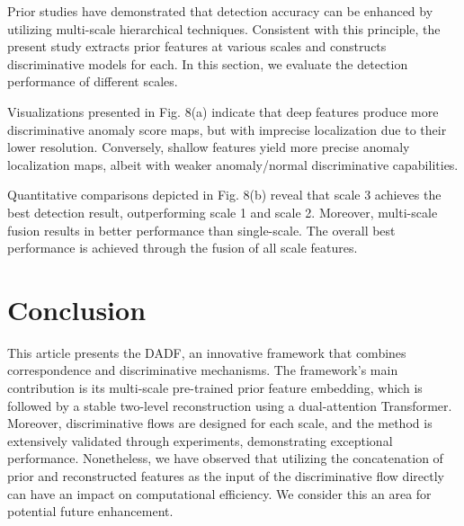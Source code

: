 \documentclass[journal]{IEEEtran}
\begin{document}
Prior studies\cite{r11} have demonstrated that detection accuracy can be enhanced by utilizing multi-scale hierarchical techniques. Consistent with this principle, the present study extracts prior features at various scales and constructs discriminative models for each. In this section, we evaluate the detection performance of different scales.

Visualizations presented in Fig. 8(a) indicate that deep features produce more discriminative anomaly score maps, but with imprecise localization due to their lower resolution. Conversely, shallow features yield more precise anomaly localization maps, albeit with weaker anomaly/normal discriminative capabilities.

Quantitative comparisons depicted in Fig. 8(b) reveal that scale 3 achieves the best detection result, outperforming scale 1 and scale 2. Moreover, multi-scale fusion results in better performance than single-scale. The overall best performance is achieved through the fusion of all scale features.


\section{Conclusion}
This article presents the DADF, an innovative framework that combines correspondence and discriminative mechanisms. The framework's main contribution is its multi-scale pre-trained prior feature embedding, which is followed by a stable two-level reconstruction using a dual-attention Transformer. Moreover, discriminative flows are designed for each scale, and the method is extensively validated through experiments, demonstrating exceptional performance. Nonetheless, we have observed that utilizing the concatenation of prior and reconstructed features as the input of the discriminative flow directly can have an impact on computational efficiency. We consider this an area for potential future enhancement.





 

\end{document}
